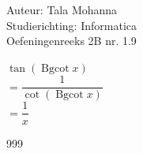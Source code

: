 \documentclass[a4paper]{article}
\begin{document}
\noindent \large Auteur: Tala Mohanna \\
\noindent \large Studierichting: Informatica\\
\noindent \large Oefeningenreeks 2B nr. 1.9\\

\medskip

\normalsize


$\tan(\operatorname{Bgcot} x)$ \\

$= \dfrac{1}{\cot(\operatorname{Bgcot} x)}$ \\

$= \dfrac{1}{x}$

\begin{thebibliography}{999}
\end{thebibliography}
\end{document}
